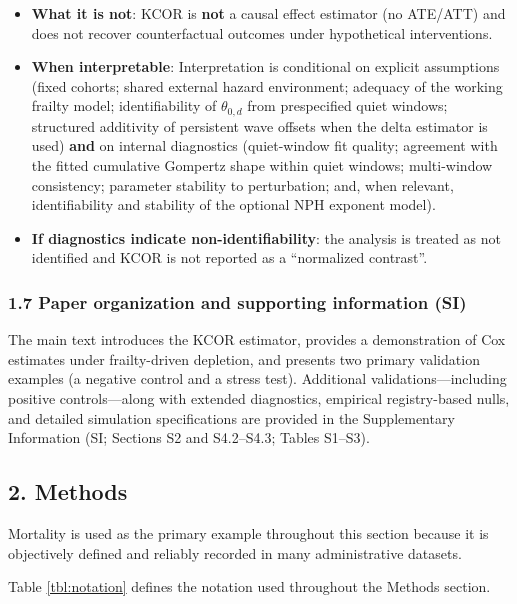 \documentclass[
]{article}
\renewenvironment{quote}{\begin{mdframed}[style=kcorquote]}{\end{mdframed}}
\begin{document}
\begin{quote}
\begin{itemize}
\item
  \textbf{What it is not}: KCOR is \textbf{not} a causal effect estimator (no ATE/ATT) and does not recover counterfactual outcomes under hypothetical interventions.
\item
  \textbf{When interpretable}: Interpretation is conditional on explicit assumptions (fixed cohorts; shared external hazard environment; adequacy of the working frailty model; identifiability of \(\theta_{0,d}\) from prespecified quiet windows; structured additivity of persistent wave offsets when the delta estimator is used) \textbf{and} on internal diagnostics (quiet-window fit quality; agreement with the fitted cumulative Gompertz shape within quiet windows; multi-window consistency; parameter stability to perturbation; and, when relevant, identifiability and stability of the optional NPH exponent model).
\item
  \textbf{If diagnostics indicate non-identifiability}: the analysis is treated as not identified and KCOR is not reported as a ``normalized contrast''.
\end{itemize}
\end{quote}

\subsubsection{1.7 Paper organization and supporting information (SI)}\label{paper-organization-and-supporting-information-si}

The main text introduces the KCOR estimator, provides a demonstration of Cox estimates under frailty-driven depletion, and presents two primary validation examples (a negative control and a stress test). Additional validations---including positive controls---along with extended diagnostics, empirical registry-based nulls, and detailed simulation specifications are provided in the Supplementary Information (SI; Sections S2 and S4.2--S4.3; Tables S1--S3).

\subsection{2. Methods}\label{methods}

Mortality is used as the primary example throughout this section because it is objectively defined and reliably recorded in many administrative datasets.

Table \ref{tbl:notation} defines the notation used throughout the Methods section.
\end{document}
